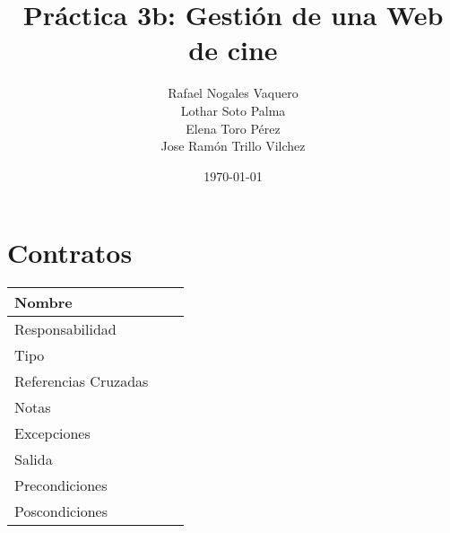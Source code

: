 \documentclass{article}
\title{Práctica 3b: Gestión de una Web de cine}
\author{Rafael Nogales Vaquero
\\Lothar Soto Palma
\\Elena Toro Pérez
\\Jose Ramón Trillo Vilchez}
\date{\today}
\begin{document}
\maketitle

\section{Contratos}
\begin{table}[h]
\begin{tabular}{|l|l|l|l|l|l|}
\hline
\multicolumn{2}{|p{3cm}|}{Nombre} & \multicolumn{3}{p{8cm}|}{}\\
\hline
\multicolumn{2}{|p{3cm}|}{Responsabilidad} & \multicolumn{4}{p{8cm}|}{} \\
\hline
\multicolumn{2}{|p{3cm}|}{Tipo} & \multicolumn{4}{p{8cm}|}{} \\
\hline
\multicolumn{2}{|p{3cm}|}{Referencias Cruzadas} & \multicolumn{4}{p{8cm}|}{} \\
\hline
\multicolumn{2}{|p{3cm}|}{Notas} & \multicolumn{4}{p{8cm}|}{} \\
\hline
\multicolumn{2}{|p{3cm}|}{Excepciones} & \multicolumn{4}{p{8cm}|}{} \\
\hline
\multicolumn{2}{|p{3cm}|}{Salida} & \multicolumn{4}{p{8cm}|}{} \\
\hline
\multicolumn{2}{|p{3cm}|}{Precondiciones} & \multicolumn{4}{p{8cm}|}{} \\
\hline
\multicolumn{2}{|p{3cm}|}{Poscondiciones} & \multicolumn{4}{p{8cm}|}{} \\
\hline
\end{tabular}
\end{table}
	
\end{document}
